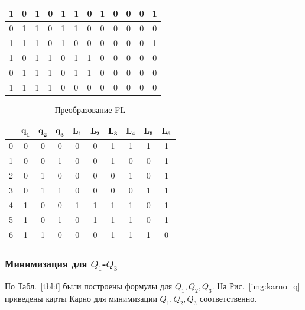 \documentclass[a4paper, final]{article}
\begin{document}
\begin{table}[h!]
\begin{tabularx}{\textwidth}{|c|c|X|X|X||X|X|X|c|c|c|c|}
  1 & 0 &   1 & 0 & 1 &  1 & 0 & 1 &  0 & 0 & 0 & 1\\
  \hline
  0 & 1 &   1 & 0 & 1 &  1 & 0 & 0 &  0 & 0 & 0 & 0\\
  \hline
  1 & 1 &   1 & 0 & 1 &  0 & 0 & 0 &  0 & 0 & 0 & 1\\
  \hline

  1 & 0 &   1 & 1 & 0 &  1 & 1 & 0 &  0 & 0 & 0 & 0\\
  \hline
  0 & 1 &   1 & 1 & 0 &  1 & 1 & 0 &  0 & 0 & 0 & 0\\
  \hline
  1 & 1 &   1 & 1 & 0 &  0 & 0 & 0 &  0 & 0 & 0 & 0\\
  \hline
  \end{tabularx}
\end{table}

\begin{table}[h!]
  \centering
  \caption{Преобразование FL}
  \label{tbl:fl}
  \footnotesize
  \begin{tabular}{|c||c|c|c||c|c|c|c|c|c|}
  \hline
      & $\mathbf{q_1}$& $\mathbf{q_2}$ & $\mathbf{q_3}$ & $\mathbf{L_1}$ & $\mathbf{L_2}$ & $\mathbf{L_3}$ & $\mathbf{L_4}$ & $\mathbf{L_5}$ & $\mathbf{L_6}$ \\
  \hline
  \hline
  0   & 0 & 0 & 0   & 0 & 0 & 1 & 1 & 1 & 1 \\
  \hline
  1   & 0 & 0 & 1   & 0 & 0 & 1 & 0 & 0 & 1 \\
  \hline
  2   & 0 & 1 & 0   & 0 & 0 & 0 & 1 & 0 & 1 \\
  \hline
  3   & 0 & 1 & 1   & 0 & 0 & 0 & 0 & 1 & 1 \\
  \hline
  4   & 1 & 0 & 0   & 1 & 1 & 1 & 1 & 0 & 1 \\
  \hline
  5   & 1 & 0 & 1   & 0 & 1 & 1 & 1 & 0 & 1 \\
  \hline
  6   & 1 & 1 & 0   & 0 & 0 & 1 & 1 & 1 & 0 \\
  \hline
  \end{tabular}
\end{table}

\newpage
\subsubsection{Минимизация для $Q_1$-$Q_3$}
По Табл.~\ref{tbl:f} были построены формулы для $Q_1, Q_2, Q_3$. На Рис.~\ref{img:karno_q} приведены карты Карно для минимизации $Q_1, Q_2, Q_3$ соответственно.
\end{document}
